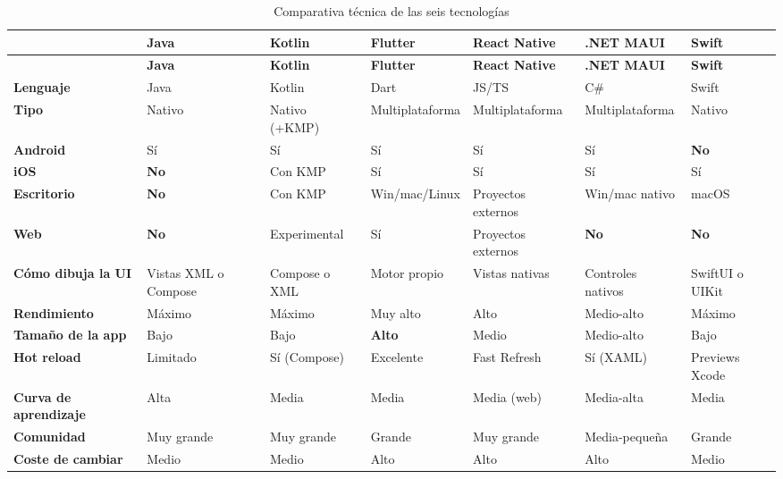 \documentclass[11pt,a4paper]{article}
\begin{document}
	{\footnotesize
		\begin{xltabular}{\textwidth}{@{}>{\RaggedRight\arraybackslash}p{2.5cm} >{\RaggedRight\arraybackslash}X >{\RaggedRight\arraybackslash}X >{\RaggedRight\arraybackslash}X >{\RaggedRight\arraybackslash}X >{\RaggedRight\arraybackslash}X >{\RaggedRight\arraybackslash}X@{}}
			\caption{Comparativa técnica de las seis tecnologías}\label{tab:tec-comparativa}\\
			\toprule
			\textcolor{paper}{\sffamily\bfseries} & \textcolor{paper}{\sffamily\bfseries Java} & \textcolor{paper}{\sffamily\bfseries Kotlin} & \textcolor{paper}{\sffamily\bfseries Flutter} & \textcolor{paper}{\sffamily\bfseries React Native} & \textcolor{paper}{\sffamily\bfseries .NET MAUI} & \textcolor{paper}{\sffamily\bfseries Swift} \\
			\midrule
			\endfirsthead
			\toprule
			\textcolor{paper}{\sffamily\bfseries} & \textcolor{paper}{\sffamily\bfseries Java} & \textcolor{paper}{\sffamily\bfseries Kotlin} & \textcolor{paper}{\sffamily\bfseries Flutter} & \textcolor{paper}{\sffamily\bfseries React Native} & \textcolor{paper}{\sffamily\bfseries .NET MAUI} & \textcolor{paper}{\sffamily\bfseries Swift} \\
			\midrule
			\endhead
			\bottomrule
			\endlastfoot
			\textbf{Lenguaje} & Java & Kotlin & Dart & JS/TS & C\# & Swift \\
			\textbf{Tipo} & Nativo & Nativo (+KMP) & Multiplataforma & Multiplataforma & Multiplataforma & Nativo \\
			\textbf{Android} & Sí & Sí & Sí & Sí & Sí & \textbf{No} \\
			\textbf{iOS} & \textbf{No} & Con KMP & Sí & Sí & Sí & Sí \\
			\textbf{Escritorio} & \textbf{No} & Con KMP & Win/mac/Linux & Proyectos externos & Win/mac nativo & macOS \\
			\textbf{Web} & \textbf{No} & Experimental & Sí & Proyectos externos & \textbf{No} & \textbf{No} \\
			\textbf{Cómo dibuja la UI} & Vistas XML o Compose & Compose o XML & Motor propio & Vistas nativas & Controles nativos & SwiftUI o UIKit \\
			\textbf{Rendimiento} & Máximo & Máximo & Muy alto & Alto & Medio-alto & Máximo \\
			\textbf{Tamaño de la app} & Bajo & Bajo & \textbf{Alto} & Medio & Medio-alto & Bajo \\
			\textbf{Hot reload} & Limitado & Sí (Compose) & Excelente & Fast Refresh & Sí (XAML) & Previews Xcode \\
			\textbf{Curva de aprendizaje} & Alta & Media & Media & Media (web) & Media-alta & Media \\
			\textbf{Comunidad} & Muy grande & Muy grande & Grande & Muy grande & Media-pequeña & Grande \\
			\textbf{Coste de cambiar} & Medio & Medio & Alto & Alto & Alto & Medio \\
		\end{xltabular}
	}
	
\end{document}
